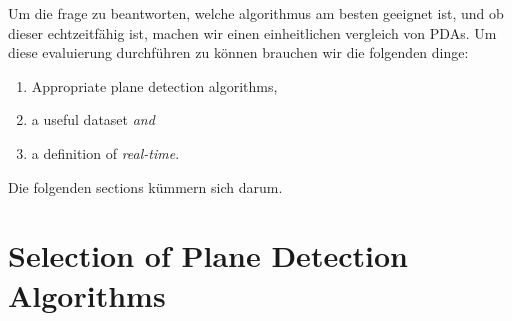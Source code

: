 \documentclass[main.tex]{subfiles}
\begin{document}
Um die frage zu beantworten, welche algorithmus am besten geeignet ist, und ob dieser echtzeitfähig ist, machen wir einen einheitlichen vergleich von PDAs.
Um diese evaluierung durchführen zu können brauchen wir die folgenden dinge:
\begin{enumerate}
    \item \label{enum:pda}Appropriate plane detection algorithms,
    \item \label{enum:ds} a useful dataset \textit{and}
    \item \label{enum:rt} a definition of \textit{real-time}.
\end{enumerate}
Die folgenden sections kümmern sich darum.



\section{Selection of Plane Detection Algorithms}\label{sec:pdaselection}
\end{document}
